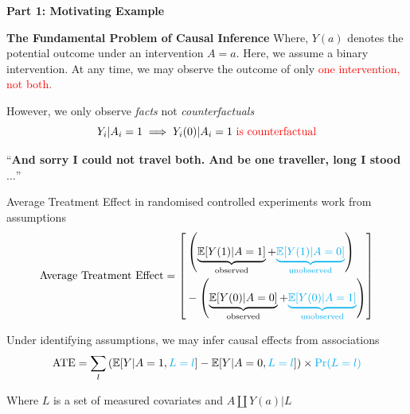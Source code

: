 \documentclass[
  ignorenonframetext,
  aspectratio=169,
]{beamer}
\begin{document}
\begin{frame}{\textbf{Part 1: Motivating Example}}
\begin{block}{\textbf{The Fundamental Problem of Causal Inference}}
Where, \(Y(a)\) denotes the potential outcome under an intervention
\(A = a\). Here, we assume a binary intervention. At any time, we may
observe the outcome of only \textcolor{red}{one intervention, not both.}
\end{block}

\begin{block}{However, we only observe \emph{facts} not
\emph{counterfactuals}}
\label{however-we-only-observe-facts-not-counterfactuals}
\[
Y_i|A_i = 1 \implies Y_i(0)|A_i = 1~ \textcolor{red}{\text{is counterfactual}}
\]

``\textbf{And sorry I could not travel both. And be one traveller, long
I stood} \(\dots\)''
\end{block}

\begin{block}{Average Treatment Effect in randomised controlled
experiments work from assumptions}
\label{average-treatment-effect-in-randomised-controlled-experiments-work-from-assumptions}
\[
\text{Average Treatment Effect} = \left[ \begin{aligned}
&\left( \underbrace{\mathbb{E}[Y(1)|A = 1]}_{\text{observed}} + \textcolor{cyan}{\underbrace{\mathbb{E}[Y(1)|A = 0]}_{\text{unobserved}}} \right) \\
&- \left( \underbrace{\mathbb{E}[Y(0)|A = 0]}_{\text{observed}} + \textcolor{cyan}{\underbrace{\mathbb{E}[Y(0)|A = 1]}_{\text{unobserved}}} \right)
\end{aligned} \right]
\]
\end{block}

\begin{block}{Under identifying assumptions, we may infer causal effects
from associations}
\label{under-identifying-assumptions-we-may-infer-causal-effects-from-associations}
\[
\text{ATE} = \sum_{l} \left( \mathbb{E}[Y|A=1, \textcolor{cyan}{L=l}] - \mathbb{E}[Y|A=0, \textcolor{cyan}{L=l}] \right) \times \textcolor{cyan}{\Pr(L=l)}
\]

Where \(L\) is a set of measured covariates and \(A\coprod Y(a)|L\)
\end{block}
\end{frame}
\end{document}
